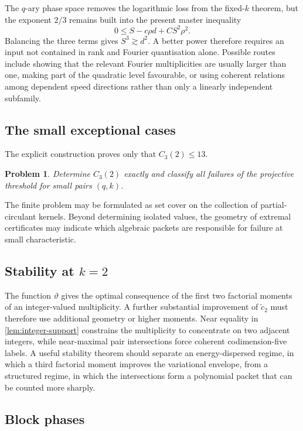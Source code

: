 \documentclass[11pt,reqno]{amsart}
\numberwithin{equation}{section}
\newtheorem{problem}[problem]{Problem}
\theoremstyle{definition}
\theoremstyle{remark}
\begin{document}
The $q$-ary phase space removes the logarithmic loss from the fixed-$k$ theorem, but the exponent $2/3$ remains built into the present master inequality
\[
 0\le S-c\rho d+CS^2\rho^2.
\]
Balancing the three terms gives $S^3\gtrsim d^2$.  A better power therefore requires an input not contained in rank and Fourier quantisation alone.  Possible routes include showing that the relevant Fourier multiplicities are usually larger than one, making part of the quadratic level favourable, or using coherent relations among dependent speed directions rather than only a linearly independent subfamily.

\subsection{The small exceptional cases}

The explicit construction proves only that $C_3(2)\le13$.

\begin{problem}
Determine $C_3(2)$ exactly and classify all failures of the projective threshold for small pairs $(q,k)$.
\end{problem}

The finite problem may be formulated as set cover on the collection of partial-circulant kernels.  Beyond determining isolated values, the geometry of extremal certificates may indicate which algebraic packets are responsible for failure at small characteristic.

\subsection{Stability at $k=2$}

The function $\vartheta$ gives the optimal consequence of the first two factorial moments of an integer-valued multiplicity.  A further substantial improvement of $\widetilde c_2$ must therefore use additional geometry or higher moments.  Near equality in \cref{lem:integer-support} constrains the multiplicity to concentrate on two adjacent integers, while near-maximal pair intersections force coherent codimension-five labels.  A useful stability theorem should separate an energy-dispersed regime, in which a third factorial moment improves the variational envelope, from a structured regime, in which the intersections form a polynomial packet that can be counted more sharply.

\subsection{Block phases}
\end{document}
